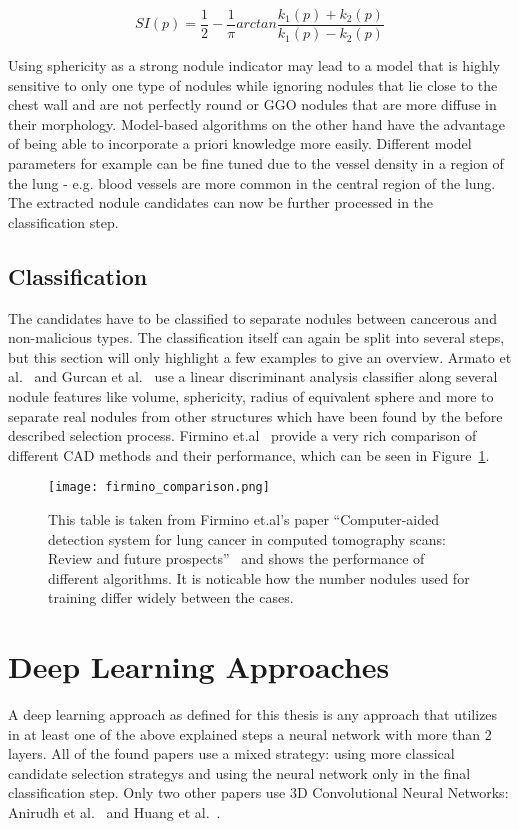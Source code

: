 \documentclass[main.tex]{subfiles}
\begin{document}
\begin{equation} \label{eq:SI}
SI(p)=\frac{1}{2}-\frac{1}{\pi}arctan\frac{k_1(p)+k_2(p)}{k_1(p)-k_2(p)}
\end{equation}

Using sphericity as a strong nodule indicator may lead to a model that is highly sensitive to only one type of nodules while ignoring nodules that lie close to the chest wall and are not perfectly round or GGO nodules that are more diffuse in their morphology. Model-based algorithms on the other hand have the advantage of being able to incorporate a priori knowledge more easily. Different model parameters for example can be fine tuned due to the vessel density in a region of the lung - e.g. blood vessels are more common in the central region of the lung. The extracted nodule candidates can now be further processed in the classification step.


\subsection{Classification}
The candidates have to be classified to separate nodules between cancerous and non-malicious types. The classification itself can again be split into several steps, but this section will only highlight a few examples to give an overview. Armato et al.~\cite{armato1999computerized} and Gurcan et al.~\cite{gurcan2002lung} use a linear discriminant analysis classifier along several nodule features like volume, sphericity, radius of equivalent sphere and more to separate real nodules from other structures which have been found by the before described selection process. Firmino et.al~\cite{firmino2014computer} provide a very rich comparison of different CAD methods and their performance, which can be seen in Figure~\ref{fig:firmino_comp}.

\begin{figure}[ht]
\centering
\texttt{[image: firmino\_comparison.png]}
\caption{This table is taken from Firmino et.al's paper ``Computer-aided detection system for lung cancer in computed tomography scans: Review and future prospects''~\cite{firmino2014computer} and shows the performance of different algorithms. It is noticable how the number nodules used for training differ widely between the cases.}
\label{fig:firmino_comp}
\end{figure}


\section{Deep Learning Approaches}
A deep learning approach as defined for this thesis is any approach that utilizes in at least one of the above explained steps a neural network with more than $2$ layers. All of the found papers use a mixed strategy: using more classical candidate selection strategys and using the neural network only in the final classification step. Only two other papers use 3D Convolutional Neural Networks: Anirudh et al.~\cite{anirudh2016lung} and Huang et al.~\cite{huang2017lung}. 
\end{document}
